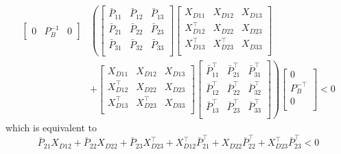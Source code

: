 \begin{equation}
  \label{eqn.condition4bCaseI6}
  \begin{split}
    \begin{bmatrix}
      0 & P_{B}^{-1} & 0
    \end{bmatrix}
    &
    \left(
    \begin{bmatrix}
      \bar{P}_{11} & \bar{P}_{12} & \bar{P}_{13} \\
      \bar{P}_{21} & \bar{P}_{22} & \bar{P}_{23}\\
      \bar{P}_{31} & \bar{P}_{32} & \bar{P}_{33}\\
    \end{bmatrix}
    \right.
    \begin{bmatrix}
      X_{D11} & X_{D12} & X_{D13} \\
      X_{D12}^{\top} & X_{D22} & X_{D23} \\
      X_{D13}^{\top} & X_{D23}^{\top} & X_{D33} \\
    \end{bmatrix} \\
    &+
    \begin{bmatrix}
      X_{D11} & X_{D12} & X_{D13} \\
      X_{D12}^{\top} & X_{D22} & X_{D23} \\
      X_{D13}^{\top} & X_{D23}^{\top} & X_{D33} \\
    \end{bmatrix}
    \left.
    \begin{bmatrix}
      \bar{P}_{11}^{\top} & \bar{P}_{21}^{\top} & \bar{P}_{31}^{\top} \\
      \bar{P}_{12}^{\top} & \bar{P}_{22}^{\top} & \bar{P}_{32}^{\top}\\
      \bar{P}_{13}^{\top} & \bar{P}_{23}^{\top} & \bar{P}_{33}^{\top}\\
    \end{bmatrix}
    \right)
    \begin{bmatrix}
      0 \\
      P_{B}^{-\top} \\
      0 \\
    \end{bmatrix}
    < 0
  \end{split}
\end{equation}
which is equivalent to
\begin{equation}
  \label{eqn.condition4bCaseI7}
  \bar{P}_{21}X_{D12} + \bar{P}_{22}X_{D22} + \bar{P}_{23}X_{D23}^{\top}
  +
  X_{D12}^{\top}\bar{P}_{21}^{\top} + X_{D22}\bar{P}_{22}^{\top} + X_{D23}^{\top}\bar{P}_{23}^{\top}
  < 0
\end{equation}
